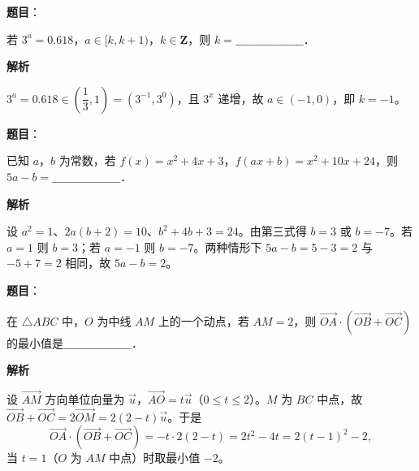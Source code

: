\begin{answer}

\textbf{题目}：

若 $3^a = 0.618$，$a \in [k, k+1)$，$k \in \mathbf{Z}$，则 $k =$＿＿＿＿＿＿．

\textbf{解析}

$3^a = 0.618 \in \left(\dfrac{1}{3}, 1\right) = \left(3^{-1}, 3^0\right)$，且 $3^x$ 递增，故 $a \in (-1, 0)$，即 $k = -1$。


\end{answer}
\begin{answer}

\textbf{题目}：

已知 $a$，$b$ 为常数，若 $f(x) = x^2 + 4x + 3$，$f(ax + b) = x^2 + 10x + 24$，则 $5a - b =$＿＿＿＿＿＿．

\textbf{解析}

设 $a^2 = 1$、$2a(b + 2) = 10$、$b^2 + 4b + 3 = 24$。由第三式得 $b = 3$ 或 $b = -7$。若 $a = 1$ 则 $b = 3$；若 $a = -1$ 则 $b = -7$。两种情形下 $5a - b = 5 - 3 = 2$ 与 $-5 + 7 = 2$ 相同，故 $5a - b = 2$。


\end{answer}
\begin{answer}

\textbf{题目}：

在 $\triangle ABC$ 中，$O$ 为中线 $AM$ 上的一个动点，若 $AM = 2$，则 $\overrightarrow{OA} \cdot \left(\overrightarrow{OB} + \overrightarrow{OC}\right)$ 的最小值是＿＿＿＿＿＿．

\textbf{解析}

设 $\overrightarrow{AM}$ 方向单位向量为 $\vec{u}$，$\overrightarrow{AO} = t\vec{u}$（$0 \leqslant t \leqslant 2$）。$M$ 为 $BC$ 中点，故 $\overrightarrow{OB} + \overrightarrow{OC} = 2\overrightarrow{OM} = 2(2 - t)\vec{u}$。于是
\nopagebreak[4]
\[
\overrightarrow{OA}\cdot\left(\overrightarrow{OB} + \overrightarrow{OC}\right) = -t\cdot 2(2-t) = 2t^2 - 4t = 2(t-1)^2 - 2,
\]
当 $t = 1$（$O$ 为 $AM$ 中点）时取最小值 $-2$。


\end{answer}
